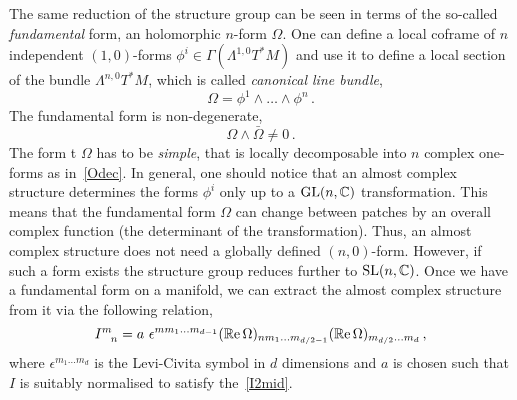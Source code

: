\documentclass[debug]{phd}
\begin{document}
						
		
						The same reduction of the structure group can be seen in terms of the so-called \emph{fundamental} form, an holomorphic $n$-form $\Omega$.
						One can define a local coframe of $n$ independent $(1,0)$-forms $\phi^i \in \Gamma(\Lambda^{1,0} T^*M)$ and use it to define a local section of the bundle $\Lambda^{n,0} T^*M$, which is called \emph{canonical line bundle},
								\begin{equation}\label{Odec}
									\Omega = \phi^1 \wedge \ldots \wedge \phi^n\, .
								\end{equation}
						The fundamental form is non-degenerate,
								\begin{equation}
									\Omega \wedge \bar{\Omega} \neq 0\, .
								\end{equation}
						The form t $\Omega$ has to be \emph{simple}, that is locally decomposable into $n$ complex one-forms as in~\eqref{Odec}.
						In general, one should notice that an almost complex structure determines the forms $\phi^i$ only up to a $\mathrm{GL}(n,\mathbb{C})$ transformation. 
						This means that the fundamental form $\Omega$ can change between patches by an overall complex function (the determinant of the transformation).
						Thus, an almost complex structure does not need a globally defined $(n,0)$-form.
						However, if such a form exists the structure group reduces further to $\mathrm{SL}(n, \mathbb{C})$.
						Once we have a fundamental form on a manifold, we can extract the almost complex structure from it via the following relation,
								\begin{equation}
									I^m_{\phantom{m}n} = a\ \epsilon^{mm_1 \ldots m_{d-1}} (\operatorname{\mathbb{R}e} \Omega)_{n m_1 \ldots m_{d/2 - 1}} (\operatorname{\mathbb{R}e} \Omega)_{m_{d/2} \ldots m_d}\, ,
								\end{equation}
						where $\epsilon^{m_1 \ldots m_d}$ is the Levi-Civita symbol in $d$ dimensions and $a$ is chosen such that $I$ is suitably normalised to satisfy the~\eqref{I2mid}.
\end{document}
